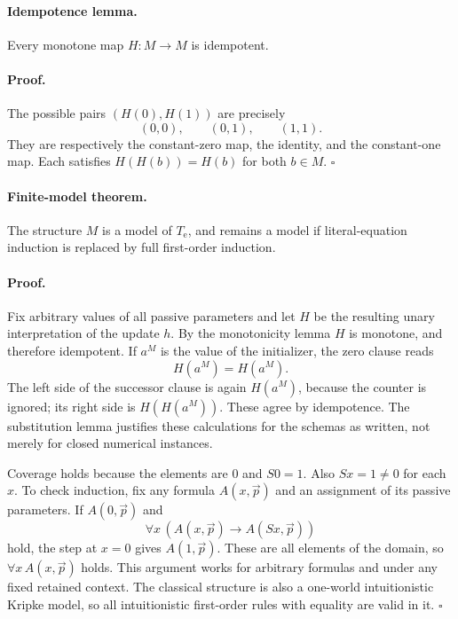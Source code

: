 \paragraph{Idempotence lemma.}
Every monotone map $H:M\to M$ is idempotent.

\paragraph{Proof.}
The possible pairs $(H(0),H(1))$ are precisely
\[
                       (0,0),\qquad(0,1),\qquad(1,1).
\]
They are respectively the constant-zero map, the identity, and the
constant-one map.  Each satisfies $H(H(b))=H(b)$ for both $b\in M$.
\hfill$\square$

\paragraph{Finite-model theorem.}
The structure $M$ is a model of $T_{\mathrm e}$, and remains a model if
literal-equation induction is replaced by full first-order induction.

\paragraph{Proof.}
Fix arbitrary values of all passive parameters and let $H$ be the
resulting unary interpretation of the update $h$.  By the monotonicity
lemma $H$ is monotone, and therefore idempotent.  If $a^M$ is the value of
the initializer, the zero clause reads
\[
                         H(a^M)=H(a^M).
\]
The left side of the successor clause is again $H(a^M)$, because the
counter is ignored; its right side is $H(H(a^M))$.  These agree by
idempotence.  The substitution lemma justifies these calculations for
the schemas as written, not merely for closed numerical instances.

Coverage holds because the elements are $0$ and $S0=1$.  Also $Sx=1\ne0$
for each $x$.  To check induction, fix any formula $A(x,\vec p)$ and an
assignment of its passive parameters.  If $A(0,\vec p)$ and
\[
             \forall x\,(A(x,\vec p)\to A(Sx,\vec p))
\]
hold, the step at $x=0$ gives $A(1,\vec p)$.  These are all elements of
the domain, so $\forall x\,A(x,\vec p)$ holds.  This argument works for
arbitrary formulas and under any fixed retained context.  The classical
structure is also a one-world intuitionistic Kripke model, so all
intuitionistic first-order rules with equality are valid in it.
\hfill$\square$

